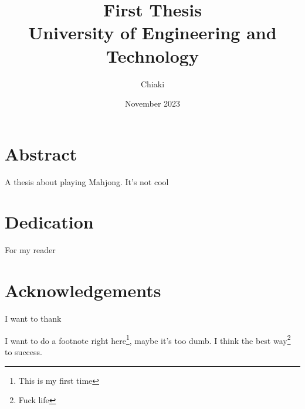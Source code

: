 \documentclass[twoside]{report}
\title{\textbf{First Thesis}\\{University of Engineering and Technology}}
\author{Chiaki}
\date{November 2023}
\begin{document}
\maketitle
\chapter*{Abstract}
A thesis about playing Mahjong. It's not cool
\chapter*{Dedication}
For my reader
\chapter*{Acknowledgements}
I want to thank
\tableofcontents
\listoffigures



\appendix

I want to do a footnote right here\footnote[1]{This is my first time}, maybe it's too dumb.
I think the best way\footnote[2]{Fuck life} to success.
\end{document}
